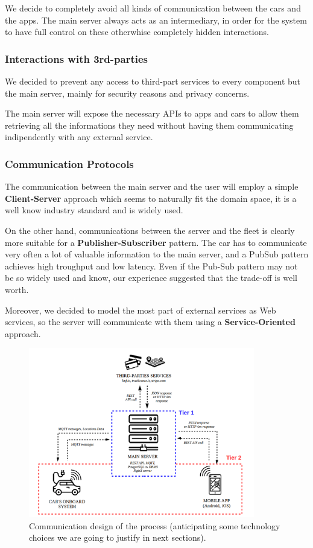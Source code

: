 \documentclass[11pt]{article} %
\begin{document}
We decide to completely avoid all kinds of communication between the cars and the apps. The main server always acts as an intermediary, in order for the system to have full control on these otherwhise completely hidden interactions.

\subsubsection{Interactions with 3rd-parties}
We decided to prevent any access to third-part services to every component but the main server, mainly for security reasons and privacy concerns.

The main server will expose the necessary APIs to apps and cars to allow them retrieving all the informations they need without having them communicating indipendently with any external service.

\subsubsection{Communication Protocols}

The communication between the main server and the user will employ a simple \textbf{Client-Server} approach which seems to naturally fit the domain space, it is a well know industry standard and is widely used.

On the other hand, communications between the server and the fleet is clearly more suitable for a \textbf{Publisher-Subscriber} pattern. The car has to communicate very often a lot of valuable information to the main server, and a PubSub pattern achieves high troughput and low latency. Even if the Pub-Sub pattern may not be so widely used and know, our experience suggested that the trade-off is well worth.

Moreover, we decided to model the most part of external services as Web services, so the server will communicate with them using a \textbf{Service-Oriented} approach.


\begin{figure}[H]
	\centering
	\includegraphics[width=0.88\textwidth]{proposed_system.png}
	\caption{Communication design of the process (anticipating some technology choices we are going to justify in next sections).}
\end{figure}
\end{document}
